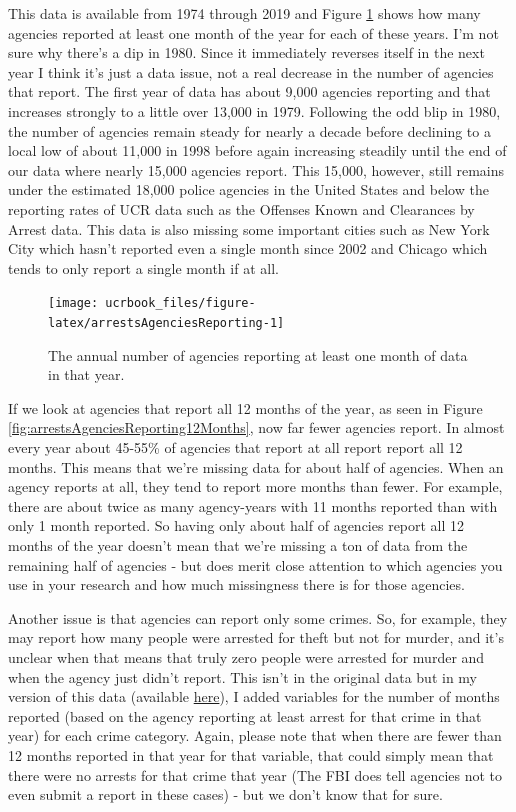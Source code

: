 \documentclass[
  12pt,
  openany]{book}
\begin{document}
This data is available from 1974 through 2019 and Figure \ref{fig:arrestsAgenciesReporting} shows how many agencies reported at least one month of the year for each of these years. I'm not sure why there's a dip in 1980. Since it immediately reverses itself in the next year I think it's just a data issue, not a real decrease in the number of agencies that report. The first year of data has about 9,000 agencies reporting and that increases strongly to a little over 13,000 in 1979. Following the odd blip in 1980, the number of agencies remain steady for nearly a decade before declining to a local low of about 11,000 in 1998 before again increasing steadily until the end of our data where nearly 15,000 agencies report. This 15,000, however, still remains under the estimated 18,000 police agencies in the United States and below the reporting rates of UCR data such as the Offenses Known and Clearances by Arrest data. This data is also missing some important cities such as New York City which hasn't reported even a single month since 2002 and Chicago which tends to only report a single month if at all.

\begin{figure}

{\centering \texttt{[image: ucrbook\_files/figure-latex/arrestsAgenciesReporting-1]} 

}

\caption{The annual number of agencies reporting at least one month of data in that year.}\label{fig:arrestsAgenciesReporting}
\end{figure}

If we look at agencies that report all 12 months of the year, as seen in Figure \ref{fig:arrestsAgenciesReporting12Months}, now far fewer agencies report. In almost every year about 45-55\% of agencies that report at all report report all 12 months. This means that we're missing data for about half of agencies. When an agency reports at all, they tend to report more months than fewer. For example, there are about twice as many agency-years with 11 months reported than with only 1 month reported. So having only about half of agencies report all 12 months of the year doesn't mean that we're missing a ton of data from the remaining half of agencies - but does merit close attention to which agencies you use in your research and how much missingness there is for those agencies.

Another issue is that agencies can report only some crimes. So, for example, they may report how many people were arrested for theft but not for murder, and it's unclear when that means that truly zero people were arrested for murder and when the agency just didn't report. This isn't in the original data but in my version of this data (available \href{https://www.openicpsr.org/openicpsr/project/102263/version/V12/view}{here}), I added variables for the number of months reported (based on the agency reporting at least arrest for that crime in that year) for each crime category. Again, please note that when there are fewer than 12 months reported in that year for that variable, that could simply mean that there were no arrests for that crime that year (The FBI does tell agencies not to even submit a report in these cases) - but we don't know that for sure.
\end{document}
